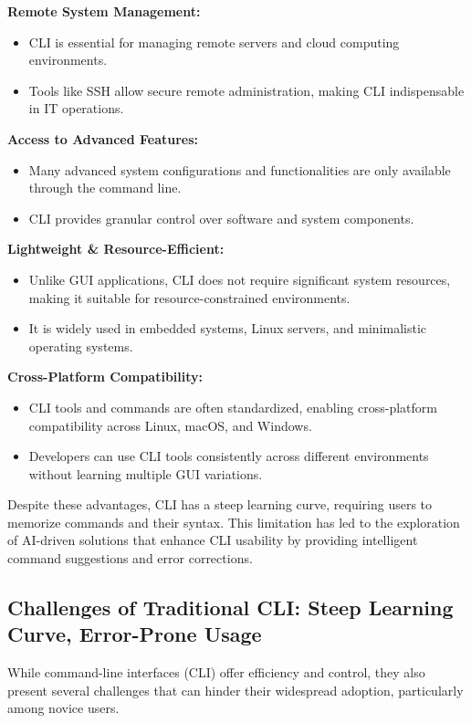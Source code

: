 \textbf{Remote System Management:}
\begin{itemize}
	\item CLI is essential for managing remote servers and cloud computing environments.
	\item Tools like SSH allow secure remote administration, making CLI indispensable in IT operations.
\end{itemize}

\textbf{Access to Advanced Features:}
\begin{itemize}
	\item Many advanced system configurations and functionalities are only available through the command line.
	\item CLI provides granular control over software and system components.
\end{itemize}

\textbf{Lightweight \& Resource-Efficient:}
\begin{itemize}
	\item Unlike GUI applications, CLI does not require significant system resources, making it suitable for resource-constrained environments.
	\item It is widely used in embedded systems, Linux servers, and minimalistic operating systems.
\end{itemize}

\textbf{Cross-Platform Compatibility:}
\begin{itemize}
	\item CLI tools and commands are often standardized, enabling cross-platform compatibility across Linux, macOS, and Windows.
	\item Developers can use CLI tools consistently across different environments without learning multiple GUI variations.
\end{itemize}

Despite these advantages, CLI has a steep learning curve, requiring users to memorize commands and their syntax. This limitation has led to the exploration of AI-driven solutions that enhance CLI usability by providing intelligent command suggestions and error corrections.

\subsection{Challenges of Traditional CLI: Steep Learning Curve, Error-Prone Usage}

While command-line interfaces (CLI) offer efficiency and control, they also present several challenges that can hinder their widespread adoption, particularly among novice users.

